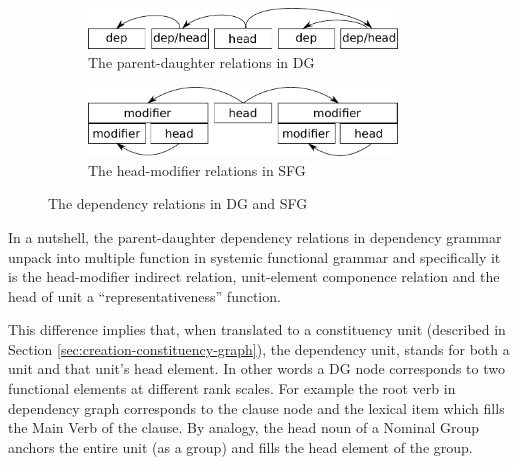 \begin{figure}[hbtp]
	\centering
	\begin{subfigure}{.5\textwidth}
		\centering
		\includegraphics[width=0.9\textwidth]{Figures/SFL-grammar/dependency-dg.pdf}
		\vspace{+22pt}
		\caption{The parent-daughter relations in DG}
		\label{fig:dependecy-dg}
	\end{subfigure}%
	\begin{subfigure}{.5\textwidth}
		\centering
		\includegraphics[width=0.9\textwidth]{Figures/SFL-grammar/dependency-sfg.pdf}
		\caption{The head-modifier relations in SFG}
		\label{fig:dependecy-sfg}
	\end{subfigure}
	\caption{The dependency relations in DG and SFG}
	\label{fig:dependency-relations}
\end{figure}

In a nutshell, the parent-daughter dependency relations in dependency grammar unpack into multiple function in systemic functional grammar and specifically it is the head-modifier indirect relation, unit-element componence relation and the head of unit a ``representativeness'' function. 

This difference implies that, when translated to a constituency unit (described in Section \ref{sec:creation-constituency-graph}), the dependency unit, stands for both a unit and that unit's head element. In other words a DG node corresponds to two functional elements at different rank scales. For example the root verb in dependency graph corresponds to the clause node and the lexical item which fills the Main Verb of the clause. By analogy, the head noun of a Nominal Group anchors the entire unit (as a group) and fills the head element of the group. 

